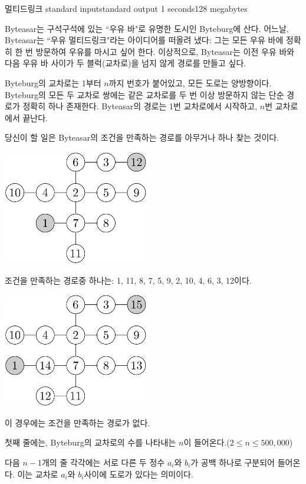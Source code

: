 \begin{problem}{멀티드링크}
	{standard input}{standard output}
	{1 seconds}{128 megabytes}{}
	
	
	Byteasar는 구석구석에 있는 ``우유 바"로 유명한 도시인 Byteburg에 산다. 어느날, Byteasar는 ``우유 멀티드링크"라는 아이디어를 떠올려 냈다: 그는 모든 우유 바에 정확히 한 번 방문하여 우유를 마시고 싶어 한다. 이상적으로, Byteasar는 이전 우유 바와 다음 우유 바 사이가 두 블럭(교차로)을 넘지 않게 경로를 만들고 싶다.
	
	Byteburg의 교차로는 1부터 $n$까지 번호가 붙어있고, 모든 도로는 양방향이다. Byteburg의 모든 두 교차로 쌍에는 같은 교차로를 두 번 이상 방문하지 않는 단순 경로가 정확히 하나 존재한다. Byteasar의 경로는 1번 교차로에서 시작하고, $n$번 교차로에서 끝난다.
	
	당신이 할 일은 Byteasar의 조건을 만족하는 경로를 아무거나 하나 찾는 것이다.
	
	\begin{center}
	\includegraphics[width=0.3\linewidth]{mul1.png}
	\end{center}
	
	조건을 만족하는 경로중 하나는: 1, 11, 8, 7, 5, 9, 2, 10, 4, 6, 3, 12이다.
	
	\begin{center}
		\includegraphics[width=0.3\linewidth]{mul2.png}
	\end{center}
	 
	이 경우에는 조건을 만족하는 경로가 없다.
	

	\InputFile
	
	첫째 줄에는, Byteburg의 교차로의 수를 나타내는 $n$이 들어온다.($2 \le n \le 500,000$) 
	
	다음 $n-1$개의 줄 각각에는 서로 다른 두 정수 $a_i$와 $b_i$가 공백 하나로 구분되어 들어온다. 이는 교차로 $a_i$와 $b_i$사이에 도로가 있다는 의미이다.
	

\end{problem}
